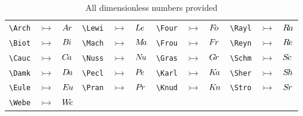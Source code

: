         \begin{table}[H]
            \centering
            \caption{All dimensionless numbers provided}
            \begin{tabular}{lll|lll|lll|lll}
                \verb|\Arch| & $\rightarrowtail $ & ${A\kern-.06em r}$ &
                \verb|\Lewi| & $\rightarrowtail $ & ${L\kern-.05em e}$ &
                \verb|\Four| & $\rightarrowtail $ & ${F\kern-.20em o}$ &
                \verb|\Rayl| & $\rightarrowtail $ & ${R\kern-.10em a}$ \\
                \verb|\Biot| & $\rightarrowtail $ & ${B\kern-.08em i}$ &
                \verb|\Mach| & $\rightarrowtail $ & ${M\kern-.20em a}$ &
                \verb|\Frou| & $\rightarrowtail $ & ${F\kern-.07em r}$ &
                \verb|\Reyn| & $\rightarrowtail $ & ${R\kern-.10em e}$ \\
                \verb|\Cauc| & $\rightarrowtail $ & ${C\kern-.13em a}$ &
                \verb|\Nuss| & $\rightarrowtail $ & ${N\kern-.15em u}$ &
                \verb|\Gras| & $\rightarrowtail $ & ${G\kern-.12em r}$ &
                \verb|\Schm| & $\rightarrowtail $ & ${S\kern-.12em c}$ \\
                \verb|\Damk| & $\rightarrowtail $ & ${D\kern-.12em a}$ &
                \verb|\Pecl| & $\rightarrowtail $ & ${P\kern-.15em e}$ &
                \verb|\Karl| & $\rightarrowtail $ & ${K\kern-.15em a}$ &
                \verb|\Sher| & $\rightarrowtail $ & ${S\kern-.12em h}$ \\
                \verb|\Eule| & $\rightarrowtail $ & ${E\kern-.09em u}$ &
                \verb|\Pran| & $\rightarrowtail $ & ${P\kern-.10em r}$ &
                \verb|\Knud| & $\rightarrowtail $ & ${K\kern-.13em n}$ &
                \verb|\Stro| & $\rightarrowtail $ & ${S\kern-.09em r}$ \\
                \verb|\Webe| & $\rightarrowtail $ & ${W\kern-.25em e}$ &
                &&&&&&&&
            \end{tabular}
        \end{table}



